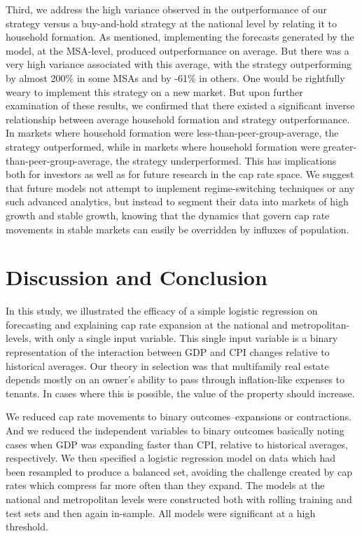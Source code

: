 Third, we address the high variance observed in the outperformance of our strategy versus a buy-and-hold strategy at the national level by relating it to household formation. As mentioned, implementing the forecasts generated by the model, at the MSA-level, produced outperformance on average. But there was a very high variance associated with this average, with the strategy outperforming by almost 200\% in some MSAs and by -61\% in others. One would be rightfully weary to implement this strategy on a new market. But upon further examination of these results, we confirmed that there existed a significant inverse relationship between average household formation and strategy outperformance. In markets where household formation were less-than-peer-group-average, the strategy outperformed, while in markets where household formation were greater-than-peer-group-average, the strategy underperformed. This has implications both for investors as well as for future research in the cap rate space. We suggest that future models not attempt to implement regime-switching techniques or any such advanced analytics, but instead to segment their data into markets of high growth and stable growth, knowing that the dynamics that govern cap rate movements in stable markets can easily be overridden by influxes of population. 


\section{Discussion and Conclusion}

In this study, we illustrated the efficacy of a simple logistic regression on forecasting and explaining cap rate expansion at the national and metropolitan-levels, with only a single input variable. This single input variable is a binary representation of the interaction between GDP and CPI changes relative to historical averages. Our theory in selection was that multifamily real estate depends mostly on an owner's ability to pass through inflation-like expenses to tenants. In cases where this is possible, the value of the property should increase.

We reduced cap rate movements to binary outcomes--expansions or contractions. And we reduced the independent variables to binary outcomes basically noting cases when GDP was expanding faster than CPI, relative to historical averages, respectively. We then specified a logistic regression model on data which had been resampled to produce a balanced set, avoiding the challenge created by cap rates which compress far more often than they expand. The models at the national and metropolitan levels were constructed both with rolling training and test sets and then again in-sample. All models were significant at a high threshold. 

